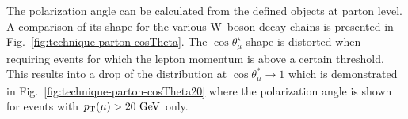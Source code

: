 
The polarization angle can be calculated from the defined objects at parton level. A comparison of its shape for the various W~boson decay chains is presented in Fig.~\ref{fig:technique-parton-cosTheta}. The $\cos\theta_{\mu}^\star$ shape is distorted when requiring events for which the lepton momentum is above a certain threshold. This results into a drop of the distribution at $\cos\theta^{*}_{\mu}\to 1$ which is demonstrated in Fig.~\ref{fig:technique-parton-cosTheta20} where the polarization angle is shown for events with $p_\mathrm{T}(\mu)>20~\mathrm{GeV}$ only.

